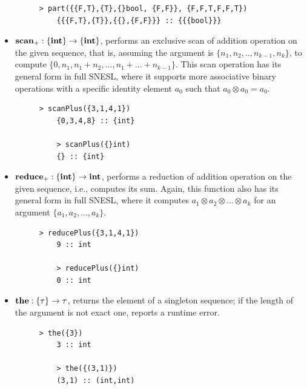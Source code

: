 \begin{itemize}
\begin{figure}[H]
\begin{lstlisting}[style = nesl-style]
	> part({{F,T},{T},{}bool, {F,F}}, {F,F,T,F,F,T})
	{{{F,T},{T}},{{},{F,F}}} :: {{{bool}}}
	\end{lstlisting}
	\end{figure}
	
	\item $\mathbf{scan_+}: \{\mathbf{int}\} \rightarrow \{\mathbf{int}\}$, performs an exclusive scan of addition operation on the given sequence, that is, assuming the argument is $\{n_1,n_2,..,n_{k-1},n_k\}$, to compute $\{0, n_1,n_1+n_2,...,n_1+...+n_{k-1}\}$. This scan operation has its general form in full SNESL, where it supports more associative binary operations with a specific identity element $a_0$  such that $a_0 \otimes a_0 = a_0$.
	\begin{figure}[H]
	\begin{example}
	\end{example}
	\begin{lstlisting}[style = nesl-style]
	> scanPlus({3,1,4,1})
	{0,3,4,8} :: {int}
	
	> scanPlus({}int)
	{} :: {int}
	\end{lstlisting}
	\end{figure}
	
	\item $\mathbf{reduce_+: \{\mathbf{int}\} \rightarrow \mathbf{int} }$, performs a reduction of addition operation on the given sequence, i.e., computes its sum. 
	Again, this function also has its general form in full SNESL, where it computes $a_1 \otimes a_2 \otimes... \otimes a_k $ for an argument $\{a_1,a_2,...,a_k\}$.
	\begin{figure}[H]
	\begin{example}
	\end{example}
	\begin{lstlisting}[style = nesl-style]
	> reducePlus({3,1,4,1})
	9 :: int
	
	> reducePlus({}int)
	0 :: int
	\end{lstlisting}
	\end{figure}


	\item $\mathbf{the:  \{\tau\} \rightarrow \tau}$, returns the element of a singleton sequence; if the length of the argument is not exact one, reports a runtime error. 
	\begin{figure}[H]
	\begin{example}
	\end{example}
	\begin{lstlisting}[style = nesl-style]
	> the({3})
	3 :: int
	
	> the({(3,1)})
	(3,1) :: (int,int)
	\end{lstlisting}
	\end{figure}
	

\end{itemize}
